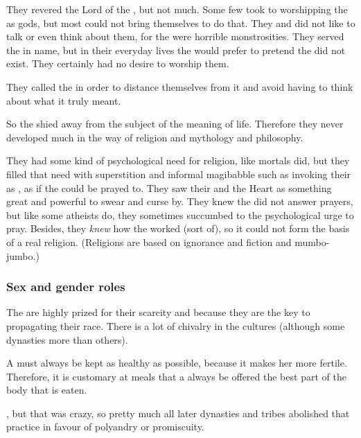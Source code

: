 They revered the Lord of the \SitraAchra, but not much.
Some few took to worshipping the \SitraAchras as gods, but most could not bring themselves to do that.
They  and did not like to talk or even think about them, for the \banes were horrible monstrosities.
They served the \banelords in name, but in their everyday lives the \resphain would prefer to pretend the \banelords did not exist.
They certainly had no desire to worship them.

They called the \SitraAchra {} in order to distance themselves from it and avoid having to think about what it truly meant. 

So the \resphain shied away from the subject of the meaning of life.
Therefore they never developed much in the way of religion and mythology and philosophy.

They had some kind of psychological need for religion, like mortals did, but they filled that need with superstition and informal magibabble such as invoking their \matrices as , as if the \matrices could be prayed to.
They saw their \matrices and the Heart as something great and powerful to swear and curse by. 
They knew the \matrices did not answer prayers, but like some atheists do, they sometimes succumbed to the psychological urge to pray.
Besides, they \emph{knew} how the \matrices worked (sort of), so it could not form the basis of a real religion. 
(Religions are based on ignorance and fiction and mumbo-jumbo.)







\subsubsection{Sex and gender roles}
The \resviel{} are highly prized for their scarcity and because they are the key to propagating their race. 
There is a lot of chivalry in the \resphan{} cultures (although some dynasties more than others). 

A \resvil{} must always be kept as healthy as possible, because it makes her more fertile. 
Therefore, it is customary at meals that a \resvil{} always be offered the best part of the body that is eaten. 

\Merkyrah{} , but that was crazy, so pretty much all later \resphan{} dynasties and tribes abolished that practice in favour of polyandry or promiscuity.


